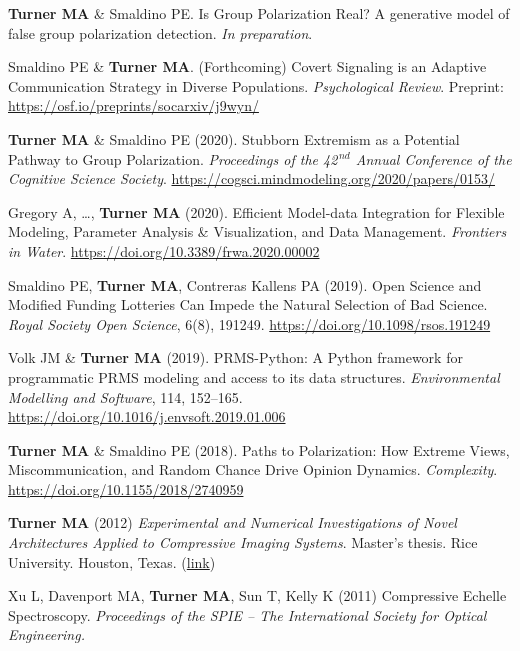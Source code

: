 \documentclass[letterpaper,11pt,oneside]{article}
\begin{document}
\begin{hangparas}{0.25in}{1}
  \textbf{Turner MA} \& Smaldino PE. Is Group Polarization Real? A generative model of false group polarization detection. 
  \emph{In preparation}.

  Smaldino PE \& \textbf{Turner MA}. (Forthcoming) Covert Signaling is an Adaptive Communication Strategy in Diverse Populations. \emph{Psychological Review}.
  Preprint: \url{https://osf.io/preprints/socarxiv/j9wyn/}

  \textbf{Turner MA} \& Smaldino PE (2020). Stubborn Extremism as a Potential Pathway to Group Polarization. \emph{Proceedings of the 42$^{\,nd}$ Annual Conference of the Cognitive Science Society}. \url{https://cogsci.mindmodeling.org/2020/papers/0153/}

    Gregory A, \ldots, \textbf{Turner MA} (2020). Efficient Model-data Integration for Flexible Modeling, Parameter Analysis \& Visualization, and Data Management. \emph{Frontiers in Water}. 
    \url{https://doi.org/10.3389/frwa.2020.00002}

    Smaldino PE, \textbf{Turner MA}, Contreras Kallens PA (2019). Open Science and Modified Funding Lotteries Can Impede the Natural Selection of Bad Science. \emph{Royal Society Open Science}, 6(8), 191249. \url{https://doi.org/10.1098/rsos.191249}

    Volk JM \& \textbf{Turner MA} (2019). PRMS-Python: A Python framework for programmatic PRMS modeling and access to its data structures. \emph{Environmental Modelling and Software}, 114, 152–165. \url{https://doi.org/10.1016/j.envsoft.2019.01.006}

    \textbf{Turner MA} \& Smaldino PE (2018). Paths to Polarization: How Extreme Views,
    Miscommunication, and Random Chance Drive Opinion Dynamics. \emph{Complexity}. \url{https://doi.org/10.1155/2018/2740959}
    
  \textbf{Turner MA} (2012) \emph{Experimental and Numerical Investigations of Novel Architectures Applied to Compressive Imaging Systems}. Master's thesis. Rice University. Houston, Texas. (\href{https://www.researchgate.net/publication/274720620_Experimental_and_Numerical_In vestigations_of_Novel_Architectures_Applied_to_Compressive_Imaging_Systems}{link})

    Xu L, Davenport MA, \textbf{Turner MA}, Sun T, Kelly K (2011) Compressive Echelle Spectroscopy. \emph{Proceedings of the SPIE – The International Society for Optical Engineering.}


\end{hangparas}
\end{document}
